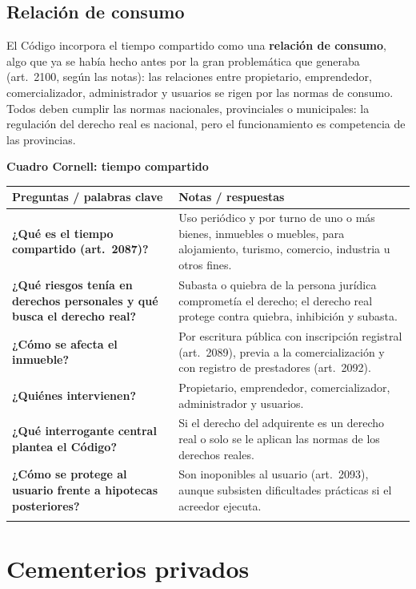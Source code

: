 \documentclass[12pt,oneside]{book}
\renewcommand{\arraystretch}{1.25}
\newcommand{\cq}[2]{\textbf{#1} & #2 \\[0.45em]}
\newcommand{\cornell}[3]{%
\par\bigskip\noindent\textbf{\large Cuadro Cornell: #1}\par\smallskip
\begin{center}
\small
\renewcommand{\arraystretch}{1.15}
\begin{tabularx}{\textwidth}{>{\raggedright\arraybackslash}p{0.27\textwidth}>{\raggedright\arraybackslash}X}
\toprule
\textbf{Preguntas / palabras clave} & \textbf{Notas / respuestas} \\
\midrule
#2
\midrule
\multicolumn{2}{p{\dimexpr\textwidth-2\tabcolsep\relax}}{\textbf{Resumen.} #3} \\
\bottomrule
\end{tabularx}
\end{center}
}
\begin{document}
\section{Relación de consumo}

El Código incorpora el tiempo compartido como una \textbf{relación de consumo}, algo que ya se había hecho antes por la gran problemática que generaba (art.~2100, según las notas): las relaciones entre propietario, emprendedor, comercializador, administrador y usuarios se rigen por las normas de consumo. %
Todos deben cumplir las normas nacionales, provinciales o municipales: la regulación del derecho real es nacional, pero el funcionamiento es competencia de las provincias.

\cornell{tiempo compartido}{
\cq{¿Qué es el tiempo compartido (art.~2087)?}{Uso periódico y por turno de uno o más bienes, inmuebles o muebles, para alojamiento, turismo, comercio, industria u otros fines.}
\cq{¿Qué riesgos tenía en derechos personales y qué busca el derecho real?}{Subasta o quiebra de la persona jurídica comprometía el derecho; el derecho real protege contra quiebra, inhibición y subasta.}
\cq{¿Cómo se afecta el inmueble?}{Por escritura pública con inscripción registral (art.~2089), previa a la comercialización y con registro de prestadores (art.~2092).}
\cq{¿Quiénes intervienen?}{Propietario, emprendedor, comercializador, administrador y usuarios.}
\cq{¿Qué interrogante central plantea el Código?}{Si el derecho del adquirente es un derecho real o solo se le aplican las normas de los derechos reales.}
\cq{¿Cómo se protege al usuario frente a hipotecas posteriores?}{Son inoponibles al usuario (art.~2093), aunque subsisten dificultades prácticas si el acreedor ejecuta.}
}{El tiempo compartido es un uso periódico y por turno de bienes afectados mediante escritura inscripta, protegido frente a acreedores posteriores y sometido a normas de consumo. Su naturaleza real sigue siendo discutida y falta la ley especial de registro.}

\chapter[Cementerios privados]{Cementerios privados}\label{cap:cp}
\end{document}
